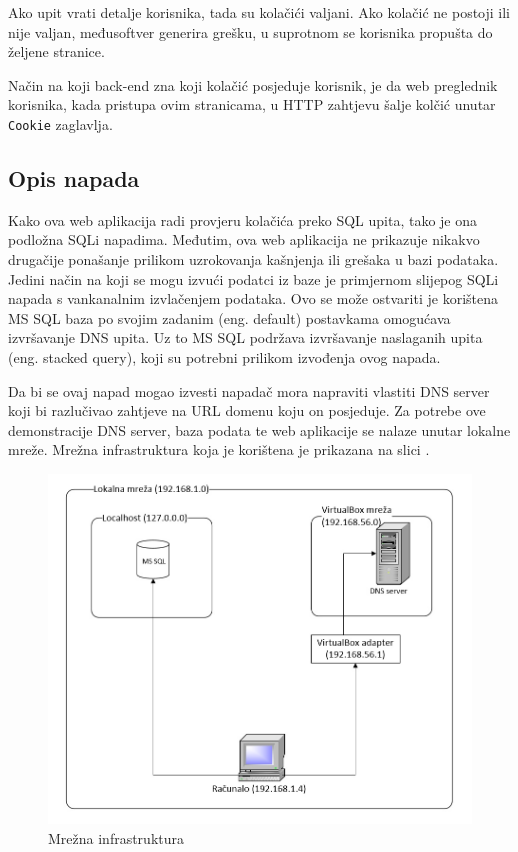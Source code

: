 \documentclass[12pt, oneside, onecolumn]{book}
\begin{document}
{Ako upit vrati detalje korisnika, tada su kolačići valjani. Ako kolačić ne postoji ili nije valjan, međusoftver generira grešku, u suprotnom se korisnika propušta do željene stranice.

Način na koji back-end zna koji kolačić posjeduje korisnik, je da web preglednik korisnika, kada pristupa ovim stranicama, u HTTP zahtjevu šalje kolčić unutar \texttt{Cookie} zaglavlja.

\subsection{Opis napada}
Kako ova web aplikacija radi provjeru kolačića preko SQL upita, tako je ona podložna SQLi napadima. Međutim, ova web aplikacija ne prikazuje nikakvo drugačije ponašanje prilikom uzrokovanja kašnjenja ili grešaka u bazi podataka. Jedini način na koji se mogu izvući podatci iz baze je primjernom slijepog SQLi napada s vankanalnim izvlačenjem podataka. Ovo se može ostvariti je korištena MS SQL baza po svojim zadanim (eng. default) postavkama omogućava izvršavanje DNS upita. Uz to MS SQL podržava izvršavanje naslaganih upita (eng. stacked query), koji su potrebni prilikom izvođenja ovog napada.

Da bi se ovaj napad mogao izvesti napadač mora napraviti vlastiti DNS server koji bi razlučivao zahtjeve na URL domenu koju on posjeduje. Za potrebe ove demonstracije DNS server, baza podata te web aplikacije se nalaze unutar lokalne mreže. Mrežna infrastruktura koja je korištena je prikazana na slici .

\begin{figure}[H]
	\begin{center}
		\includegraphics[width=\textwidth]{bsqli_arh.jpg}
		\caption{Mrežna infrastruktura} \label{fig:bsqli_arh}
	\end{center}
\end{figure}

}
\end{document}
